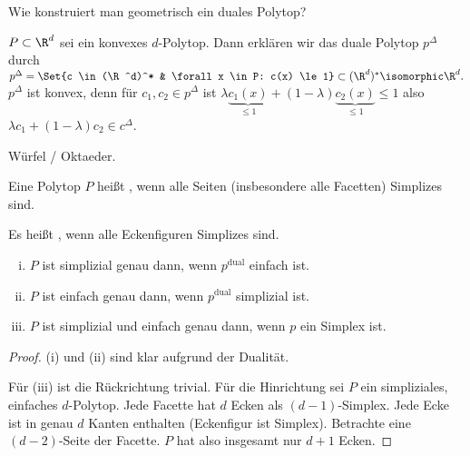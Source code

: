 Wie konstruiert man geometrisch ein duales Polytop?

\begin{df}
    $P \subset \R^d$ sei ein konvexes $d$-Polytop.
    Dann erklären wir das duale Polytop $p^\Delta$ durch
    \begin{math}
        p^\Delta = \Set{c \in (\R^d)^* & \forall x \in P: c(x) \le 1}
        \subset (\R^d)^* \isomorphic \R^d.
    \end{math}
    $p^\Delta$ ist konvex, denn für $c_1, c_2 \in p^\Delta$ ist
    \begin{math}
        \lambda \underbrace{c_1(x)}_{\le 1} + (1-\lambda)\underbrace{c_2(x)}_{\le 1} \le 1
    \end{math}
    also $\lambda c_1 + (1-\lambda) c_2 \in c^\Delta$.
\end{df}

\begin{ex}
    Würfel / Oktaeder.
\end{ex}

\begin{df}
    Eine Polytop $P$ heißt , wenn alle Seiten (insbesondere alle Facetten) Simplizes sind.

    Es heißt , wenn alle Eckenfiguren Simplizes sind.
\end{df}


\begin{kor}
    \begin{enumerate}[(i)]
        \item
            $P$ ist simplizial genau dann, wenn $p^{\text{dual}}$ einfach ist.
        \item
            $P$ ist einfach genau dann, wenn $p^{\text{dual}}$ simplizial ist.
        \item
            $P$ ist simplizial und einfach genau dann, wenn $p$ ein Simplex ist.
    \end{enumerate}
    \begin{proof}
        (i) und (ii) sind klar aufgrund der Dualität.

        Für (iii) ist die Rückrichtung trivial.
        Für die Hinrichtung sei $P$ ein simpliziales, einfaches $d$-Polytop.
        Jede Facette hat $d$ Ecken als $(d-1)$-Simplex.
        Jede Ecke ist in genau $d$ Kanten enthalten (Eckenfigur ist Simplex).
        Betrachte eine $(d-2)$-Seite der Facette.
        $P$ hat also insgesamt nur $d+1$ Ecken.
    \end{proof}
\end{kor}


